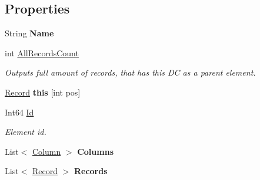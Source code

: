 \subsection*{Properties}
\begin{DoxyCompactItemize}
\item 
\hypertarget{class_dwarf_d_b_1_1_data_structures_1_1_data_container_ac285de692141c079be1bce8dccebb859}{
String {\bfseries Name}}
\label{class_dwarf_d_b_1_1_data_structures_1_1_data_container_ac285de692141c079be1bce8dccebb859}

\item 
int \hyperlink{class_dwarf_d_b_1_1_data_structures_1_1_data_container_af2f2d766cbb2729f91effb3c68fd97e0}{AllRecordsCount}
\begin{DoxyCompactList}\small\item\em Outputs full amount of records, that has this DC as a parent element. \item\end{DoxyCompactList}\item 
\hypertarget{class_dwarf_d_b_1_1_data_structures_1_1_data_container_a8b12c9bac22fa5ad7d007267f06e20c1}{
\hyperlink{class_dwarf_d_b_1_1_data_structures_1_1_record}{Record} {\bfseries this} \mbox{[}int pos\mbox{]}}
\label{class_dwarf_d_b_1_1_data_structures_1_1_data_container_a8b12c9bac22fa5ad7d007267f06e20c1}

\item 
Int64 \hyperlink{class_dwarf_d_b_1_1_data_structures_1_1_data_container_a3749f4fe324b56d46caf071488c615d7}{Id}
\begin{DoxyCompactList}\small\item\em Element id. \item\end{DoxyCompactList}\item 
\hypertarget{class_dwarf_d_b_1_1_data_structures_1_1_data_container_a4b7bab104009e416ea771276c2e7161a}{
List$<$ \hyperlink{class_dwarf_d_b_1_1_data_structures_1_1_column}{Column} $>$ {\bfseries Columns}}
\label{class_dwarf_d_b_1_1_data_structures_1_1_data_container_a4b7bab104009e416ea771276c2e7161a}

\item 
\hypertarget{class_dwarf_d_b_1_1_data_structures_1_1_data_container_a04e95f117bfb96a32811e7bfeb6c7c32}{
List$<$ \hyperlink{class_dwarf_d_b_1_1_data_structures_1_1_record}{Record} $>$ {\bfseries Records}}
\label{class_dwarf_d_b_1_1_data_structures_1_1_data_container_a04e95f117bfb96a32811e7bfeb6c7c32}

\end{DoxyCompactItemize}


